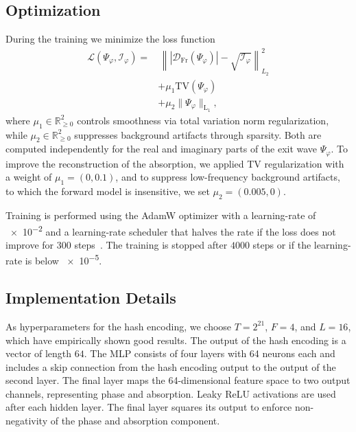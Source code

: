 \documentclass{article}
\begin{document}
\subsection{Optimization}
During the training we minimize the loss function 
\begin{equation}
	\begin{split}
		\mathcal{L}
			\left(
				\Psi_{ \varphi}, 
				\mathcal{I}_\varphi 
			\right)
 		= &\, 
			 \left\|
 				\left|
					 \mathcal{D}_{\mathrm{Fr}}
					 \left(
						 \Psi_{ \varphi}
					 \right)
				 \right|
 				- \sqrt{\mathcal{I}_\varphi}
			 \right\|_{L_{2}}^{2} \\
   		& + \mu_{1} \mathrm{TV}
			\left(
				\Psi_{ \varphi} 
			\right)
		  \\
   & + \mu_{2} \| \Psi_{ \varphi} \|_{\mathrm{L}_{1}}
,
 \label{eq:loss}
\end{split}
\end{equation}
where $\mu_{1}\in \mathbb{R}_{\geq 0}^{2}$ controls smoothness via total variation norm regularization, while $\mu_{2} \in \mathbb{R}_{\geq 0}^{2}$ suppresses background artifacts through sparsity.
Both are computed independently for the real and imaginary parts of the exit wave $\Psi_{\varphi}$.  
 To improve the reconstruction of the absorption, we applied TV regularization with a weight of $ \mu_{1}= \left( 0, 0.1 \right) $, and to suppress low-frequency background artifacts, to which the forward model is insensitive, we set $ \mu_{2}= \left( 0.005, 0 \right) $.

Training is performed using the AdamW optimizer with a learning-rate of \num{e-2} and a learning-rate scheduler that halves the rate if the loss does not improve for $300$ steps~\cite{loshchilovDecoupledWeightDecay2019}.
The training is stopped after $4000$ steps or if the learning-rate is below \num{e-5}.

\subsection{Implementation Details}
As hyperparameters for the hash encoding, we choose $T = 2^{21}$, $F = 4$, and $L = 16$, which have empirically shown good results.  
The output of the hash encoding is a vector of length $64$.  
The MLP consists of four layers with 64 neurons each and includes a skip connection from the hash encoding output to the output of the second layer.  
The final layer maps the 64-dimensional feature space to two output channels, representing phase and absorption.  
Leaky ReLU activations are used after each hidden layer.  
The final layer squares its output to enforce non-negativity of the phase and absorption component.  
\end{document}
